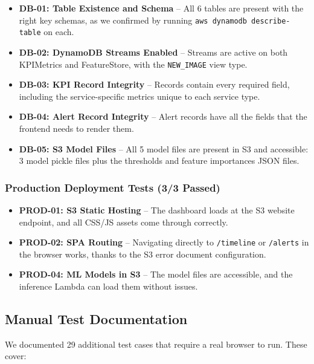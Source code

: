 \documentclass[11pt,a4paper]{article}
\newcommand{\cmark}{\textcolor{UNBGreen}{\ding{51}}}
\begin{document}
\begin{itemize}[leftmargin=2em]
    \item \textbf{DB-01: Table Existence and Schema} -- All 6 tables are present with the right key schemas, as we confirmed by running \texttt{aws dynamodb describe-table} on each. \cmark
    \item \textbf{DB-02: DynamoDB Streams Enabled} -- Streams are active on both KPIMetrics and FeatureStore, with the \texttt{NEW\_IMAGE} view type. \cmark
    \item \textbf{DB-03: KPI Record Integrity} -- Records contain every required field, including the service-specific metrics unique to each service type. \cmark
    \item \textbf{DB-04: Alert Record Integrity} -- Alert records have all the fields that the frontend needs to render them. \cmark
    \item \textbf{DB-05: S3 Model Files} -- All 5 model files are present in S3 and accessible: 3 model pickle files plus the thresholds and feature importances JSON files. \cmark
\end{itemize}

\subsubsection{Production Deployment Tests (3/3 Passed)}

\begin{itemize}[leftmargin=2em]
    \item \textbf{PROD-01: S3 Static Hosting} -- The dashboard loads at the S3 website endpoint, and all CSS/JS assets come through correctly. \cmark
    \item \textbf{PROD-02: SPA Routing} -- Navigating directly to \texttt{/timeline} or \texttt{/alerts} in the browser works, thanks to the S3 error document configuration. \cmark
    \item \textbf{PROD-04: ML Models in S3} -- The model files are accessible, and the inference Lambda can load them without issues. \cmark
\end{itemize}

\subsection{Manual Test Documentation}

We documented 29 additional test cases that require a real browser to run. These cover:
\end{document}
